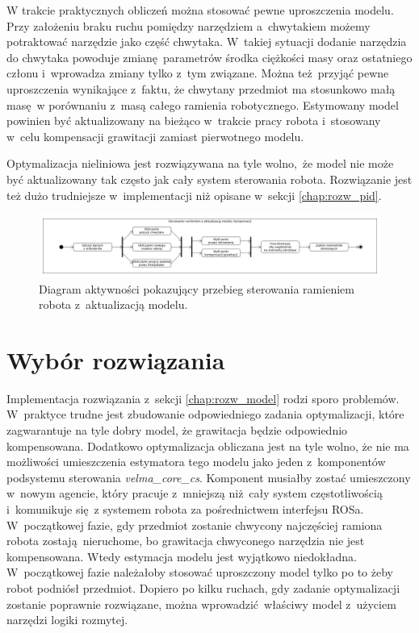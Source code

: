 W trakcie praktycznych obliczeń można stosować pewne uproszczenia modelu. Przy założeniu braku ruchu pomiędzy narzędziem a~chwytakiem możemy potraktować narzędzie jako część chwytaka. W~takiej sytuacji dodanie narzędzia do chwytaka powoduje zmianę parametrów środka ciężkości masy oraz ostatniego członu i~wprowadza zmiany tylko z~tym związane. Można też przyjąć pewne uproszczenia wynikające z~faktu, że chwytany przedmiot ma stosunkowo małą masę w porównaniu z~masą całego ramienia robotycznego. Estymowany model powinien być aktualizowany na bieżąco w~trakcie pracy robota i~stosowany w~celu kompensacji grawitacji zamiast pierwotnego modelu.

Optymalizacja nieliniowa jest rozwiązywana na tyle wolno, że model nie może być aktualizowany tak często jak cały system sterowania robota. Rozwiązanie jest też dużo trudniejsze w~implementacji niż opisane w~sekcji \ref{chap:rozw_pid}. 

\begin{figure}
	\centering
	\includegraphics[width=.99\textwidth]{images/komp_model.png}
	\caption{Diagram aktywności pokazujący przebieg sterowania ramieniem robota z~aktualizacją modelu.}
	\label{fig:kompensacja}
\end{figure}

\section{Wybór rozwiązania}

Implementacja rozwiązania z~sekcji \ref{chap:rozw_model} rodzi sporo problemów. W~praktyce trudne jest zbudowanie odpowiedniego zadania optymalizacji, które zagwarantuje na tyle dobry model, że grawitacja będzie odpowiednio kompensowana. Dodatkowo optymalizacja obliczana jest na tyle wolno, że nie ma możliwości umieszczenia estymatora tego modelu jako jeden z~komponentów podsystemu sterowania \textit{velma\_core\_cs}. Komponent musiałby zostać umieszczony w~nowym agencie, który pracuje z~mniejszą niż cały system częstotliwością i~komunikuje się z systemem robota za pośrednictwem interfejsu ROSa. W~początkowej fazie, gdy przedmiot zostanie chwycony najczęściej ramiona robota zostają nieruchome, bo grawitacja chwyconego narzędzia nie jest kompensowana. Wtedy estymacja modelu jest wyjątkowo niedokładna. W~początkowej fazie należałoby stosować uproszczony model tylko po to żeby robot podniósł przedmiot. Dopiero po kilku ruchach, gdy zadanie optymalizacji zostanie poprawnie rozwiązane, można wprowadzić właściwy model z~użyciem narzędzi logiki rozmytej.

